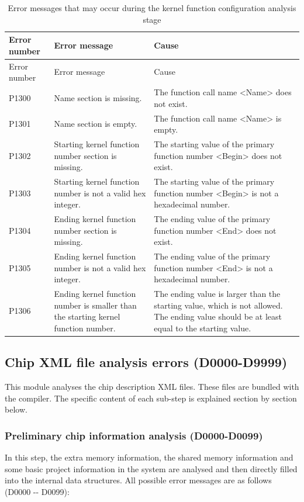 \begin{xltabular}{\textwidth}{@{}>{\hsize\raggedright\arraybackslash}X>{\hsize\raggedright\arraybackslash}X>{\hsize\raggedright\arraybackslash}X@{}}
\caption{Error messages that may occur during the kernel function configuration analysis stage}\label{tab:5-16}\\
\toprule
Error number & Error message & Cause\tabularnewline
\endfirsthead
\toprule
Error number & Error message & Cause\tabularnewline
\midrule
\endhead
\bottomrule
\endlastfoot
P1300 & Name section is missing. &
The function call name <Name> does not exist.\tabularnewline
P1301 & Name section is empty. &
The function call name <Name> is empty.\tabularnewline
P1302 & Starting kernel function number section is missing. &
The starting value of the primary function number <Begin> does not exist.\tabularnewline
P1303 & Starting kernel function number is not a valid hex integer. &
The starting value of the primary function number <Begin> is not a hexadecimal number.\tabularnewline
P1304 & Ending kernel function number section is missing. &
The ending value of the primary function number <End> does not exist.\tabularnewline
P1305 & Ending kernel function number is not a valid hex integer. &
The ending value of the primary function number <End> is not a hexadecimal number.\tabularnewline
P1306 & Ending kernel function number is smaller than the starting
kernel function number. &
The ending value is larger than the starting value, which is not allowed. The ending value should be at least equal to the starting value.\tabularnewline
\end{xltabular}

\subsection{Chip XML file analysis errors (D0000-D9999)}\label{subsec:5-6-3}

This module analyses the chip description XML files. These files are bundled with the compiler. The specific content of each sub-step is explained section by section below.

\subsubsection{Preliminary chip information analysis (D0000-D0099)}\label{subsubsec:5-6-3-1}

In this step, the extra memory information, the shared memory information and some basic project information in the system are analysed and then directly filled into the internal data structures. All possible error messages are as follows (D0000
-\/- D0099):

